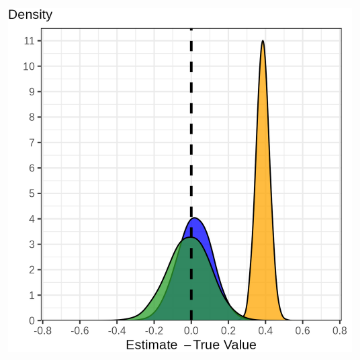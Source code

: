 \documentclass[dvipsnames]{beamer} %
\begin{document}
\begin{frame}[noframenumbering]
{{\begin{figure}
\begin{subfigure}[c]{0.475\textwidth}
            \includegraphics[width=\textwidth]{
                ../programs/simulations/sim-output/uniform-indirect-dist.png}
        \end{subfigure}
    \end{figure} }}
\end{frame}
\end{document}

